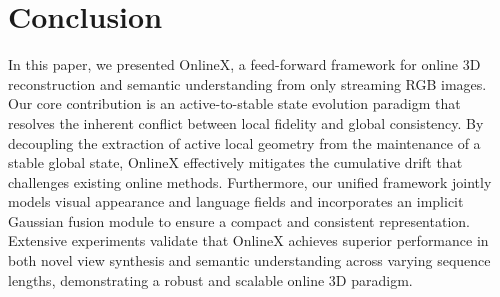 \section{Conclusion}
In this paper, we presented OnlineX, a feed-forward framework for online 3D reconstruction and semantic understanding from only streaming RGB images. Our core contribution is an active-to-stable state evolution paradigm that resolves the inherent conflict between local fidelity and global consistency. By decoupling the extraction of active local geometry from the maintenance of a stable global state, OnlineX effectively mitigates the cumulative drift that challenges existing online methods. Furthermore, our unified framework jointly models visual appearance and language fields and incorporates an implicit Gaussian fusion module to ensure a compact and consistent representation. Extensive experiments validate that OnlineX achieves superior performance in both novel view synthesis and semantic understanding across varying sequence lengths, demonstrating a robust and scalable online 3D paradigm.